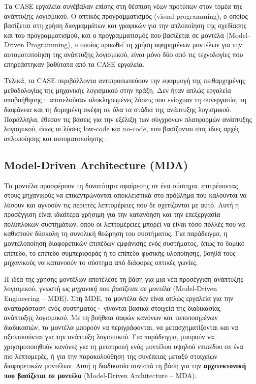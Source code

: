             Τα CASE εργαλεία συνέβαλαν επίσης στη θέσπιση νέων προτύπων στον τομέα της ανάπτυξης λογισμικού. Ο οπτικός προγραμματισμός (visual programming), ο οποίος βασίζεται στη χρήση διαγραμμάτων και γραφικών για την απλοποίηση της σχεδίασης και του προγραμματισμού, και ο προγραμματισμός που βασίζεται σε μοντέλα (Model-Driven Programming), ο οποίος προωθεί τη χρήση αφηρημένων μοντέλων για την αυτοματοποίηση της ανάπτυξης λογισμικού, είναι μόνο δύο από τις τεχνολογίες που επηρεάστηκαν βαθύτατα από τα CASE εργαλεία.

            Τελικά, τα CASE περιβάλλοντα αντιπροσωπεύουν την εφαρμογή της πειθαρχημένης μεθοδολογίας της μηχανικής λογισμικού στην πράξη. Δεν ήταν απλώς εργαλεία υποβοήθησης· αποτελούσαν ολοκληρωμένες λύσεις που ενίσχυαν τη συνεργασία, τη διαφάνεια και τη δομημένη σκέψη σε όλα τα στάδια της ανάπτυξης λογισμικού. Παράλληλα, έθεσαν τις βάσεις για την εξέλιξη των σύγχρονων πλατφορμών ανάπτυξης λογισμικού, όπως οι λύσεις low-code και no-code, που βασίζονται στις ίδιες αρχές απλοποίησης και αυτοματοποίησης \cite{CASEChikofsky, Case1985, CASEKuhn, AdoptionCASE}.

        \subsection{Model-Driven Architecture (MDA)}
            Τα μοντέλα προσφέρουν τη δυνατότητα αφαίρεσης σε ένα σύστημα, επιτρέποντας στους μηχανικούς να επικεντρώνονται αποκλειστικά στο πρόβλημα που καλούνται να λύσουν και αγνοούν τις περιττές λεπτομέρειες που δε σχετίζονται με αυτό. Αυτή η προσέγγιση είναι ιδιαίτερα χρήσιμη για την κατανόηση και την επεξεργασία πολύπλοκων συστημάτων, όπου οι λεπτομέρειες μπορεί να είναι τόσο πολλές που να καθιστούν δύσκολη τη συνολική θεώρηση του συστήματος. Για παράδειγμα, η μοντελοποίηση διαφορετικών επιπέδων εμφάνισης ενός συστήματος, όπως το δομικό επίπεδο, το επίπεδο συμπεριφοράς ή το επίπεδο φυσικής υλοποίησης, βοηθά τους μηχανικούς να κατανοούν το σύστημα από διάφορες οπτικές γωνίες.

            Η ιδέα της χρήσης μοντέλων αποτέλεσε τη βάση για μια νέα προσέγγιση ανάπτυξης λογισμικού, γνωστή ως \textit{μηχανική που βασίζεται σε μοντέλα} (Model-Driven Engineering -- MDE). Στη MDE, τα μοντέλα δεν είναι απλώς εργαλεία για την αναπαράσταση ενός συστήματος· γίνονται βασικά στοιχεία της διαδικασίας ανάπτυξης λογισμικού. Με τη βοήθεια σαφών κανόνων και τυποποιημένων διαδικασιών, τα μοντέλα μπορούν να περιγράφονται, να μετασχηματίζονται και να αξιοποιούνται για την ανάπτυξη λογισμικού. Για παράδειγμα, μπορούν να χρησιμοποιηθούν κανόνες για τη μετατροπή ενός μοντέλου υψηλού επιπέδου σε ένα πιο λεπτομερές, ή για την παρακολούθηση της συνέπειας μεταξύ στοιχείων διαφορετικών μοντέλων. Αυτή η διαδικασία συνιστά τη βάση για την \textbf{αρχιτεκτονική που βασίζεται σε μοντέλα} (Model-Driven Architecture -- MDA).

